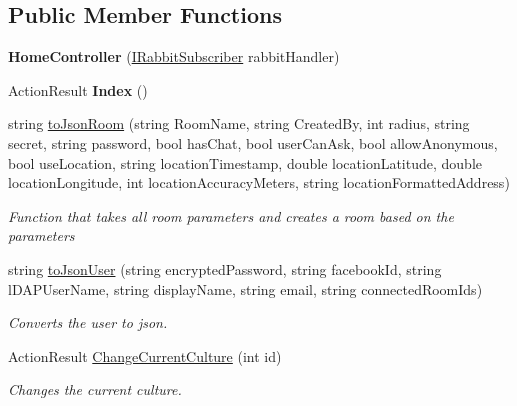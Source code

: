 \subsection*{Public Member Functions}
\begin{DoxyCompactItemize}
\item 
\hypertarget{class_wis_r_1_1_controllers_1_1_home_controller_a7eb560f712e3e661ca25ab0ee6bf6748}{}{\bfseries Home\+Controller} (\hyperlink{interface_wis_r_1_1_providers_1_1_i_rabbit_subscriber}{I\+Rabbit\+Subscriber} rabbit\+Handler)\label{class_wis_r_1_1_controllers_1_1_home_controller_a7eb560f712e3e661ca25ab0ee6bf6748}

\item 
\hypertarget{class_wis_r_1_1_controllers_1_1_home_controller_a6eb5805f5911ac9b7c672973081c0924}{}Action\+Result {\bfseries Index} ()\label{class_wis_r_1_1_controllers_1_1_home_controller_a6eb5805f5911ac9b7c672973081c0924}

\item 
string \hyperlink{class_wis_r_1_1_controllers_1_1_home_controller_ab0a0ecf5fdd7e41f55ee6a708c69b336}{to\+Json\+Room} (string Room\+Name, string Created\+By, int radius, string secret, string password, bool has\+Chat, bool user\+Can\+Ask, bool allow\+Anonymous, bool use\+Location, string location\+Timestamp, double location\+Latitude, double location\+Longitude, int location\+Accuracy\+Meters, string location\+Formatted\+Address)
\begin{DoxyCompactList}\small\item\em Function that takes all room parameters and creates a room based on the parameters \end{DoxyCompactList}\item 
string \hyperlink{class_wis_r_1_1_controllers_1_1_home_controller_ace9e6955340d205d2ce9945db09e8800}{to\+Json\+User} (string encrypted\+Password, string facebook\+Id, string l\+D\+A\+P\+User\+Name, string display\+Name, string email, string connected\+Room\+Ids)
\begin{DoxyCompactList}\small\item\em Converts the user to json. \end{DoxyCompactList}\item 
Action\+Result \hyperlink{class_wis_r_1_1_controllers_1_1_home_controller_af6ec83feda3ae50d7d86075c14fc2903}{Change\+Current\+Culture} (int id)
\begin{DoxyCompactList}\small\item\em Changes the current culture. \end{DoxyCompactList}\end{DoxyCompactItemize}
